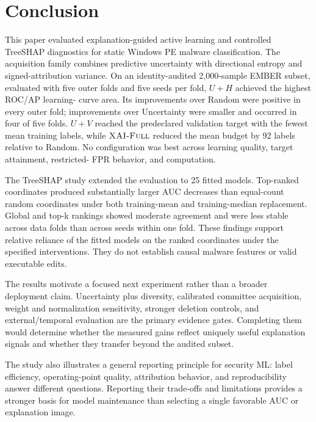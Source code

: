 \section{Conclusion}
\label{sec:conclusion}

This paper evaluated explanation-guided active learning and controlled TreeSHAP
diagnostics for static Windows PE malware classification. The acquisition family
combines predictive uncertainty with directional entropy and signed-attribution
variance. On an identity-audited 2,000-sample EMBER subset, evaluated with five
outer folds and five seeds per fold, $U+H$ achieved the highest ROC/AP learning-
curve area. Its improvements over Random were positive in every outer fold;
improvements over Uncertainty were smaller and occurred in four of five folds.
$U+V$ reached the predeclared validation target with the fewest mean training
labels, while $\textsc{XAI-Full}$ reduced the mean budget by 92 labels relative to Random.
No configuration was best across learning quality, target attainment, restricted-
FPR behavior, and computation.

The TreeSHAP study extended the evaluation to 25 fitted models. Top-ranked
coordinates produced substantially larger AUC decreases than equal-count random
coordinates under both training-mean and training-median replacement. Global and
top-k rankings showed moderate agreement and were less stable across data folds
than across seeds within one fold. These findings support relative reliance of
the fitted models on the ranked coordinates under the specified interventions.
They do not establish causal malware features or valid executable edits.

The results motivate a focused next experiment rather than a broader deployment
claim. Uncertainty plus diversity, calibrated committee acquisition, weight and
normalization sensitivity, stronger deletion controls, and external/temporal
evaluation are the primary evidence gates. Completing them would determine
whether the measured gains reflect uniquely useful explanation signals and
whether they transfer beyond the audited subset.

The study also illustrates a general reporting principle for security ML: label
efficiency, operating-point quality, attribution behavior, and reproducibility
answer different questions. Reporting their trade-offs and limitations provides
a stronger basis for model maintenance than selecting a single favorable AUC or
explanation image.

